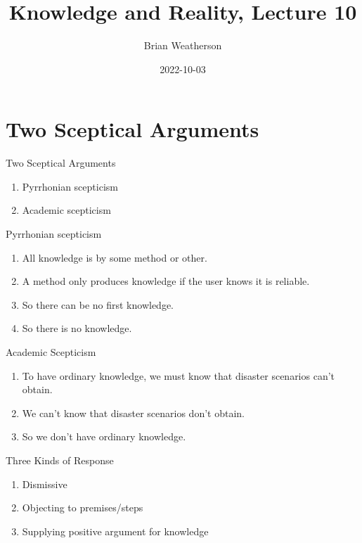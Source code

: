 \documentclass[
  17pt,
  letterpaper,
  ignorenonframetext,
  aspectratio=169,
]{beamer}
\title{Knowledge and Reality, Lecture 10}
\author{Brian Weatherson}
\date{2022-10-03}
\providecommand{\tightlist}{%
  \setlength{\itemsep}{0pt}\setlength{\parskip}{0pt}}\usepackage{longtable,booktabs,array}
\begin{document}
\frame{\titlepage}
\ifdefined\Shaded\renewenvironment{Shaded}{\begin{tcolorbox}[borderline west={3pt}{0pt}{shadecolor}, boxrule=0pt, interior hidden, frame hidden, enhanced, sharp corners, breakable]}{\end{tcolorbox}}\fi

\hypertarget{two-sceptical-arguments}{%
\section{Two Sceptical Arguments}\label{two-sceptical-arguments}}

\begin{frame}{Two Sceptical Arguments}
\protect\hypertarget{two-sceptical-arguments-1}{}
\begin{enumerate}[<+->]
\tightlist
\item
  Pyrrhonian scepticism
\item
  Academic scepticism
\end{enumerate}
\end{frame}

\begin{frame}{Pyrrhonian scepticism}
\protect\hypertarget{pyrrhonian-scepticism}{}
\begin{enumerate}[<+->]
\tightlist
\item
  All knowledge is by some method or other.
\item
  A method only produces knowledge if the user knows it is reliable.
\item
  So there can be no first knowledge.
\item
  So there is no knowledge.
\end{enumerate}
\end{frame}

\begin{frame}{Academic Scepticism}
\protect\hypertarget{academic-scepticism}{}
\begin{enumerate}[<+->]
\tightlist
\item
  To have ordinary knowledge, we must know that disaster scenarios can't
  obtain.
\item
  We can't know that disaster scenarios don't obtain.
\item
  So we don't have ordinary knowledge.
\end{enumerate}
\end{frame}

\begin{frame}{Three Kinds of Response}
\protect\hypertarget{three-kinds-of-response}{}
\begin{enumerate}[<+->]
\tightlist
\item
  Dismissive
\item
  Objecting to premises/steps
\item
  Supplying positive argument for knowledge
\end{enumerate}
\end{frame}
\end{document}
